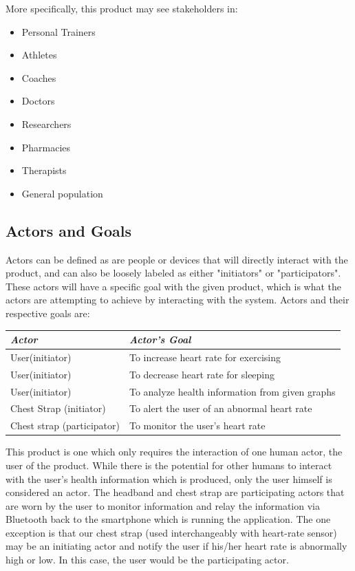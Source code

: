 \documentclass[letterpaper,english, 12pt]{scrreprt}
\begin{document}
More specifically, this product may see stakeholders in:
\begin{itemize}
	\item Personal Trainers
	\item Athletes
	\item Coaches
	\item Doctors
	\item Researchers
	\item Pharmacies
	\item Therapists
	\item General population
\end{itemize}

\subsection{Actors and Goals}
Actors can be defined as are people or devices that will directly interact with the product, and can also be loosely labeled as either "initiators" or "participators". These actors will have a specific goal with the given product, which is what the actors are attempting to achieve by interacting with the system. Actors and their respective goals are:
\begin{center}
	\begin{tabular}{|l|l|}
		\hline
		\emph{Actor} & \emph{Actor's Goal} \\\hline
		User(initiator)& To increase heart rate for exercising\\\hline
		User(initiator)& To decrease heart rate for sleeping\\\hline
		User(initiator)& To analyze health information from given graphs\\\hline
		Chest Strap (initiator) & To alert the user of an abnormal heart rate\\\hline
		Chest strap (participator)& To monitor the user's heart rate\\\hline
	\end{tabular}
\end{center}
This product is one which only requires the interaction of one human actor, the user of the product. While there is the potential for other humans to interact with the user's health information which is produced, only the user himself is considered an actor. The headband and chest strap are participating actors that are worn by the user to monitor information and relay the information via Bluetooth back to the smartphone which is running the application. The one exception is that our chest strap (used interchangeably with heart-rate sensor) may be an initiating actor and notify the user if his/her heart rate is abnormally high or low. In this case, the user would be the participating actor.
\end{document}
